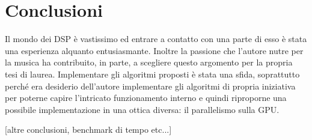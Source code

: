 \chapter{Conclusioni}
Il mondo dei DSP è vastissimo ed entrare a contatto con una parte di esso è stata una esperienza alquanto entusiasmante. Inoltre la passione che l'autore nutre per la musica ha contribuito, in parte, a scegliere questo argomento per la propria tesi di laurea. Implementare gli algoritmi proposti è stata una sfida, soprattutto perché era desiderio dell'autore implementare gli algoritmi di propria iniziativa per poterne capire l'intricato funzionamento interno e quindi riproporne una possibile implementazione in una ottica diversa: il parallelismo sulla GPU.

[altre conclusioni, benchmark di tempo etc...]
